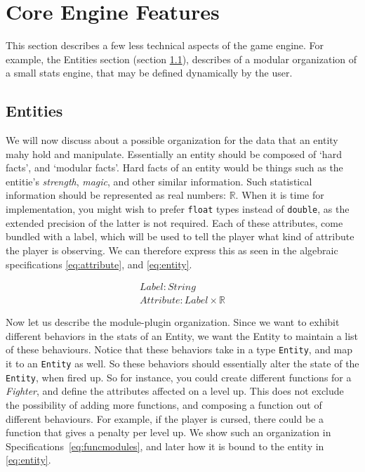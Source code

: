 \section{Core Engine Features}

This section describes a few less technical aspects of the game engine. For
example, the Entities section (section \ref{sec:entities}), describes of a
modular organization of a small stats engine, that may be defined dynamically by
the user.

\subsection{Entities}
\label{sec:entities}

We will now discuss about a possible organization for the data that an entity
mahy hold and manipulate. Essentially an entity should be composed of `hard
facts', and `modular facts'. Hard facts of an entity would be things such as the
entitie's \textit{strength}, \textit{magic}, and other similar information. Such
statistical information should be represented as real numbers: $\mathbb{R}$.
When it is time for implementation, you might wish to prefer \texttt{float}
types instead of \texttt{double}, as the extended precision of the latter is not
required. Each of these attributes, come bundled with a label, which will be
used to tell the player what kind of attribute the player is observing. We can
therefore express this as seen in the algebraic specifications
\ref{eq:attribute}, and \ref{eq:entity}.

\begin{equation}
\begin{split}
  \label{eq:attribute}
  Label\colon String \\
  Attribute\colon Label \times \mathbb{R}
\end{split}
\end{equation}

Now let us describe the module-plugin organization. Since we want to exhibit
different behaviors in the stats of an Entity, we want the Entity to maintain
a list of these behaviours. Notice that these behaviors take in a type
\texttt{Entity}, and map it to an \texttt{Entity} as well. So these behaviors
should essentially alter the state of the \texttt{Entity}, when fired up. So for
instance, you could create different functions for a \textit{Fighter}, and
define the attributes affected on a level up. This does not exclude the
possibility of adding more functions, and composing a function out of different
behaviours. For example, if the player is cursed, there could be a function that
gives a penalty per level up. We show such an organization in
Specifications~\ref{eq:funcmodules}, and later how it is bound to the entity in
\ref{eq:entity}.

